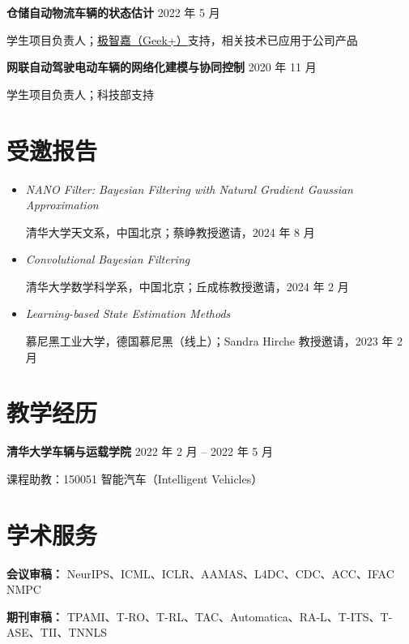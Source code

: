 \documentclass[11pt,a4paper]{article}
\newlength{\gapS}\setlength{\gapS}{4pt plus 3pt minus 1pt}  %
\newlength{\gapM}\setlength{\gapM}{6pt plus 4pt minus 2pt}  %
\begin{document}
\textbf{仓储自动物流车辆的状态估计} \hfill 2022 年 5 月\par
学生项目负责人；\href{https://www.geekplus.com/en/}{极智嘉（Geek+）}支持，相关技术已应用于公司产品
\vspace{\gapM}

\textbf{网联自动驾驶电动车辆的网络化建模与协同控制} \hfill 2020 年 11 月\par
学生项目负责人；科技部支持

\section{受邀报告}
\begin{itemize}[leftmargin=0pt,itemindent=0pt,labelsep=0pt,label={},itemsep=\gapS,parsep=0pt,topsep=3pt plus 1pt]
\justifying
\setlength{\parindent}{0pt}
\relax
\item \textit{NANO Filter: Bayesian Filtering with Natural Gradient Gaussian Approximation}\par
清华大学天文系，中国北京；蔡峥教授邀请，2024 年 8 月
\item \textit{Convolutional Bayesian Filtering}\par
清华大学数学科学系，中国北京；丘成栋教授邀请，2024 年 2 月
\item \textit{Learning-based State Estimation Methods}\par
慕尼黑工业大学，德国慕尼黑（线上）；Sandra Hirche 教授邀请，2023 年 2 月
\end{itemize}

\section{教学经历}
\textbf{清华大学车辆与运载学院} \hfill 2022 年 2 月 -- 2022 年 5 月\par
课程助教：150051 智能汽车（Intelligent Vehicles）

\section{学术服务}
\textbf{会议审稿：} NeurIPS、ICML、ICLR、AAMAS、L4DC、CDC、ACC、IFAC NMPC\par
\vspace{2pt}
\textbf{期刊审稿：} TPAMI、T-RO、T-RL、TAC、Automatica、RA-L、T-ITS、T-ASE、TII、TNNLS
\end{document}
